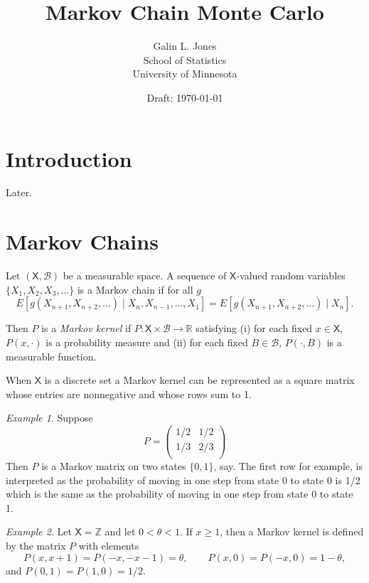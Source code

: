 \documentclass[12pt]{article}
\title{Markov Chain Monte Carlo}
\author{Galin L. Jones\\
{\small School of Statistics}\\
{\small University of Minnesota}}
\date{Draft: \today}
\theoremstyle{plain}
\theoremstyle{definition}
\theoremstyle{remark}
\newtheorem{example}{Example}[section]
\newcommand{\X}{\mathsf{X}}
\newcommand{\B}{\mathcal{B}}
\newcommand{\real}{\mathbb{R}}
\begin{document}
\maketitle

\tableofcontents

\section{Introduction}
\label{mcmc:sec:intro}

Later.

\section{Markov Chains}
\label{mcmc:sec:markov}

Let $(\X, \B)$ be a measurable space.  A sequence of
$\X$-valued random variables $\{X_1, X_2, X_3, \ldots \}$ is a Markov
chain if for all $g$
\[
E\left[ g(X_{n+1}, X_{n+2}, \ldots) \mid X_n, X_{n-1}, \ldots, X_1
\right] = E\left[ g(X_{n+1}, X_{n+2}, \ldots) \mid X_n\right].
\]

Then $P$ is a {\em Markov kernel}
if $P : \X \times \mathcal{B} \to \real$ satisfying (i) for each fixed
$x \in \X$, $P(x, \cdot)$ is a probability measure and (ii) for each fixed
$B \in \mathcal{B}$, $P(\cdot, B)$ is a measurable function.  

When $\X$ is a discrete set a Markov kernel can be represented as a
square matrix whose entries are nonnegative and whose rows sum to 1.

\begin{example}
  Suppose
  \[
    P= \begin{pmatrix}
      1/2 & 1/2 \\
      1/3 & 2/3\\
      \end{pmatrix}
  \]
  Then $P$ is  a Markov matrix on two states $\{0, 1\}$, say.  The
  first row for example, is interpreted as
  the probability of moving in one step from state 0 to state 0 is 1/2
  which is the same as the probability of moving in one step from state 0 to state 1.
 \end{example}

\begin{example}
  Let $\X=\mathbb{Z}$ and let $0 < \theta < 1$.  If $x \ge 1$, then a
  Markov kernel is defined by the matrix $P$ with elements
  \[
    P(x, x+1) = P(-x, -x-1) = \theta, \quad \quad P(x,0)=P(-x,0) = 1- \theta,
  \]
  and $P(0,1)=P(1,0) =1/2$.
\end{example}
\end{document}
